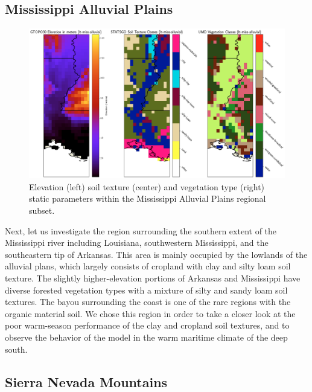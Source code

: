 \subsection{Mississippi Alluvial Plains}

\begin{figure}[h!]
    \centering

    \includegraphics[width=.99\linewidth,draft=false]{figures/lt-static/static_all-3_miss-alluvial.png}

    \caption{Elevation (left) soil texture (center) and vegetation type (right) static parameters within the Mississippi Alluvial Plains regional subset.}
    \label{lt_static_miss-alluvial}
\end{figure}

Next, let us investigate the region surrounding the southern extent of the Mississippi river including Louisiana, southwestern Mississippi, and the southeastern tip of Arkansas. This area is mainly occupied by the lowlands of the alluvial plans, which largely consists of cropland with clay and silty loam soil texture. The slightly higher-elevation portions of Arkansas and Mississippi have diverse forested vegetation types with a mixture of silty and sandy loam soil textures. The bayou surrounding the coast is one of the rare regions with the organic material soil. We chose this region in order to take a closer look at the poor warm-season performance of the clay and cropland soil textures, and to observe the behavior of the model in the warm maritime climate of the deep south.

\subsection{Sierra Nevada Mountains}

